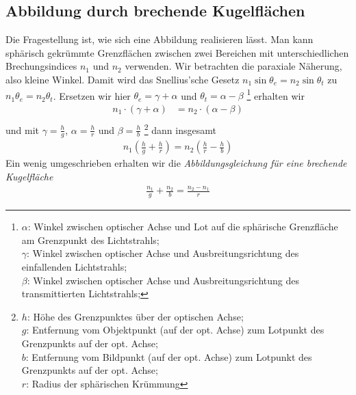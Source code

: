 \subsection{Abbildung durch brechende Kugelflächen}
Die Fragestellung ist, wie sich eine Abbildung realisieren lässt.
Man kann sphärisch gekrümmte Grenzflächen zwischen zwei Bereichen mit
unterschiedlichen Brechungsindices $n_1$ und $n_2$ verwenden.
Wir betrachten die paraxiale Näherung, also kleine Winkel.
Damit wird das Snellius'sche Gesetz $n_1\sin\theta_e =
n_2\sin\theta_t$ zu $n_1\theta_e=n_2\theta_t$.
Ersetzen wir hier $\theta_e=\gamma+\alpha$ und $\theta_t=\alpha-\beta$%
\footnote{{} $\alpha$: Winkel zwischen optischer Achse und Lot auf die sphärische
Grenzfläche am Grenzpunkt des Lichtstrahls;\\
$\gamma$: Winkel zwischen optischer Achse und Ausbreitungsrichtung des
einfallenden Lichtstrahls;\\
$\beta$: Winkel zwischen optischer Achse und Ausbreitungsrichtung des
transmittierten Lichtstrahls;}
erhalten wir
\begin{align*}
  n_1\cdot(\gamma+\alpha) &= n_2\cdot(\alpha-\beta)\\
\end{align*}
und mit
$\gamma = \frac{h}{g}$,
$\alpha =\frac{h}{r}$ und
$\beta = \frac{h}{b}$%
\footnote{{} $h$: Höhe des Grenzpunktes über der optischen Achse;\\
$g$: Entfernung vom Objektpunkt (auf der opt. Achse) zum Lotpunkt des
Grenzpunkts auf der opt. Achse;\\
$b$: Entfernung vom Bildpunkt (auf der opt. Achse) zum Lotpunkt des
Grenzpunkts auf der opt. Achse;\\
$r$: Radius der sphärischen Krümmung}
dann insgesamt
\begin{gather*}
  n_1\left(\frac{h}{g} + \frac{h}{r}\right)
  = n_2\left(\frac{h}{r} - \frac{h}{b}\right)
\end{gather*}
Ein wenig umgeschrieben erhalten wir die \emph{Abbildungsgleichung für
  eine brechende Kugelfläche}
\begin{gather}
  \frac{n_1}{g} + \frac{n_2}{b} = \frac{n_2-n_1}{r}
  \label{abbgleichung}
\end{gather}


